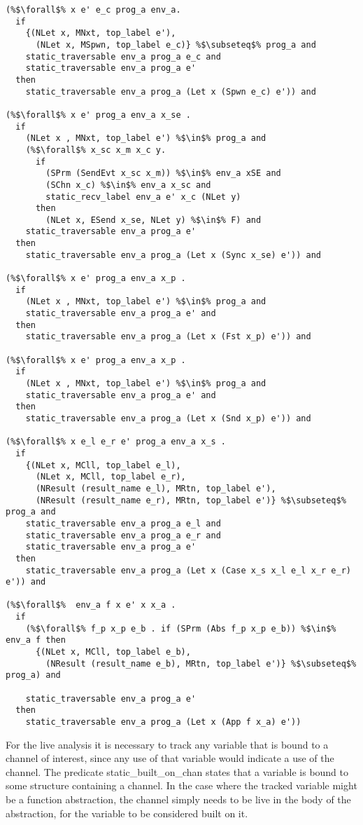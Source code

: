 \documentclass{article}
\begin{document}
\begin{lstlisting}[language=logic, style=codestyle1, escapechar=\%]
(%$\forall$% x e' e_c prog_a env_a.
  if
    {(NLet x, MNxt, top_label e'),
      (NLet x, MSpwn, top_label e_c)} %$\subseteq$% prog_a and
    static_traversable env_a prog_a e_c and
    static_traversable env_a prog_a e'
  then
    static_traversable env_a prog_a (Let x (Spwn e_c) e')) and

(%$\forall$% x e' prog_a env_a x_se .
  if
    (NLet x , MNxt, top_label e') %$\in$% prog_a and
    (%$\forall$% x_sc x_m x_c y.
      if
        (SPrm (SendEvt x_sc x_m)) %$\in$% env_a xSE and 
        (SChn x_c) %$\in$% env_a x_sc and
        static_recv_label env_a e' x_c (NLet y)
      then
        (NLet x, ESend x_se, NLet y) %$\in$% F) and
    static_traversable env_a prog_a e'
  then
    static_traversable env_a prog_a (Let x (Sync x_se) e')) and

(%$\forall$% x e' prog_a env_a x_p .
  if
    (NLet x , MNxt, top_label e') %$\in$% prog_a and
    static_traversable env_a prog_a e' and
  then
    static_traversable env_a prog_a (Let x (Fst x_p) e')) and

(%$\forall$% x e' prog_a env_a x_p .
  if
    (NLet x , MNxt, top_label e') %$\in$% prog_a and
    static_traversable env_a prog_a e' and
  then
    static_traversable env_a prog_a (Let x (Snd x_p) e')) and

(%$\forall$% x e_l e_r e' prog_a env_a x_s .
  if
    {(NLet x, MCll, top_label e_l),
      (NLet x, MCll, top_label e_r),
      (NResult (result_name e_l), MRtn, top_label e'),
      (NResult (result_name e_r), MRtn, top_label e')} %$\subseteq$% prog_a and
    static_traversable env_a prog_a e_l and
    static_traversable env_a prog_a e_r and
    static_traversable env_a prog_a e'
  then
    static_traversable env_a prog_a (Let x (Case x_s x_l e_l x_r e_r) e')) and
  
(%$\forall$%  env_a f x e' x x_a .
  if
    (%$\forall$% f_p x_p e_b . if (SPrm (Abs f_p x_p e_b)) %$\in$% env_a f then 
      {(NLet x, MCll, top_label e_b),
        (NResult (result_name e_b), MRtn, top_label e')} %$\subseteq$% prog_a) and

    static_traversable env_a prog_a e'
  then
    static_traversable env_a prog_a (Let x (App f x_a) e'))

  \end{lstlisting}


For the live analysis it is necessary to track any variable that is bound to a channel of
interest, since any use of that variable would indicate a use of the channel. The predicate
static\_built\_on\_chan states that a variable is bound to some structure containing a channel. 
In the case where the tracked variable might be a function abstraction, the channel simply
needs to be live in the body of the abstraction, for the variable to be considered built on it.
\end{document}

